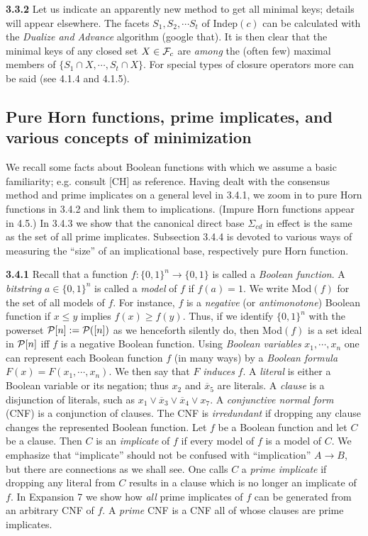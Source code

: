 \documentclass[11pt]{article}
\newcommand{\ol}{\overline}
\newcommand{\ra}{\rightarrow}
\begin{document}
{\bf 3.3.2} Let us indicate an apparently new method to get all minimal keys; details will appear elsewhere. The facets $S_1, S_2, \cdots S_t$ of Indep$(c)$ can be calculated with the {\it Dualize and Advance} algorithm (google that). It is then clear that the minimal keys of any closed set $X \in {\cal F}_c$ are {\it among} the (often few) maximal members of $\{S_1 \cap X, \cdots, S_t \cap X\}$. For special types of closure operators more can be said (see 4.1.4 and 4.1.5).



\subsection{Pure Horn functions, prime implicates, and various concepts of minimization}

We recall some facts about Boolean functions with which we assume a basic familiarity; e.g. consult [CH] as reference. Having dealt with the consensus method and prime implicates on a general level in 3.4.1, we zoom in to pure Horn functions in 3.4.2 and link them to implications. (Impure Horn functions appear in 4.5.) In 3.4.3 we show that the canonical direct base $\Sigma_{cd}$ in effect is the same as the set of all prime implicates. Subsection 3.4.4 is devoted to various ways of measuring the ``size'' of an implicational base, respectively pure Horn function.

{\bf 3.4.1} Recall that a function $f: \{0,1\}^n \ra \{0,1\}$ is called a {\it Boolean function}. A {\it bitstring} $a \in \{0,1\}^n$ is called a {\it model} of $f$ if $f(a) =1$. We write Mod$(f)$ for the set of all models of $f$. For instance, $f$ is a {\it negative} (or {\it antimonotone}) Boolean function if $x \leq y$ implies $f(x) \geq f(y)$.  
Thus, if we identify $\{0,1\}^n$ with the powerset ${\cal P}[n]: = {\cal P}([n])$ as we henceforth silently do, then Mod$(f)$ is a set ideal in ${\cal P}[n]$ iff $f$ is a negative Boolean function. Using {\it Boolean variables} $x_1, \cdots, x_n$ one can represent each Boolean function $f$ (in many ways) by a {\it Boolean formula} $F(x) = F(x_1, \cdots, x_n)$. We then say that $F$ {\it induces} $f$. A {\it literal} is either a Boolean variable or its negation; thus $x_2$ and $\ol{x}_5$ are literals. A {\it clause} is a disjunction of literals, such as $x_1 \vee \ol{x}_3 \vee \ol{x}_4 \vee x_7$. A {\it conjunctive normal form} (CNF) is a conjunction of clauses.  The CNF is {\it irredundant} if dropping any clause changes the represented Boolean function. Let $f$ be a Boolean function and let $C$ be a clause. Then $C$ is an {\it implicate} of $f$ if every model of $f$ is a model of $C$. We emphasize that ``implicate'' should not be confused with ``implication'' $A \ra B$, but there are connections as we shall see. One calls $C$ a {\it prime implicate} if dropping any literal from $C$ results in a clause which is no longer an implicate of $f$. In Expansion 7 we show how {\it all} prime implicates of $f$ can be generated from an arbitrary CNF of $f$. A {\it prime} CNF is a CNF all of whose clauses are prime implicates.
\end{document}
